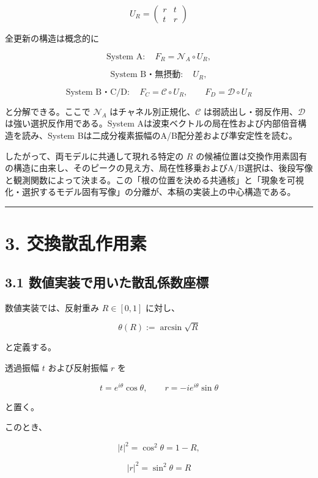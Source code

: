 \documentclass[
  a4paper,
  10pt]{article}
\begin{document}
\[
\boxed{
U_R=
\begin{pmatrix}
r&t\\
t&r
\end{pmatrix}
}
\]

全更新の構造は概念的に

\[
\text{System A}:\quad F_R=\mathcal N_A\circ U_R,
\]

\[
\text{System B・無摂動}:\quad U_R,
\]

\[
\text{System B・C/D}:\quad
F_C=\mathcal C\circ U_R,
\qquad
F_D=\mathcal D\circ U_R
\]

と分解できる。ここで \(\mathcal N_A\) はチャネル別正規化、\(\mathcal C\)
は弱読出し・弱反作用、\(\mathcal D\) は強い選択反作用である。System
Aは波束ベクトルの局在性および内部倍音構造を読み、System
Bは二成分複素振幅のA/B配分差および準安定性を読む。

したがって、両モデルに共通して現れる特定の \(R\)
の候補位置は交換作用素固有の構造に由来し、そのピークの見え方、局在性移乗およびA/B選択は、後段写像と観測関数によって決まる。この「根の位置を決める共通核」と「現象を可視化・選択するモデル固有写像」の分離が、本稿の実装上の中心構造である。

\begin{center}\rule{0.5\linewidth}{0.5pt}\end{center}

\section{3.
交換散乱作用素}\label{3-ux4ea4ux63dbux6563ux4e71ux4f5cux7528ux7d20}

\subsection{3.1
数値実装で用いた散乱係数座標}\label{31-ux6570ux5024ux5b9fux88c5ux3067ux7528ux3044ux305fux6563ux4e71ux4fc2ux6570ux5ea7ux6a19}

数値実装では、反射重み \(R\in[0,1]\) に対し、

\[
\theta(R):=\arcsin\sqrt R
\]

と定義する。

透過振幅 \(t\) および反射振幅 \(r\) を

\[
t=e^{i\theta}\cos\theta,
\qquad
r=-ie^{i\theta}\sin\theta
\]

と置く。

このとき、

\[
|t|^2=\cos^2\theta=1-R,
\]

\[
|r|^2=\sin^2\theta=R
\]
\end{document}
